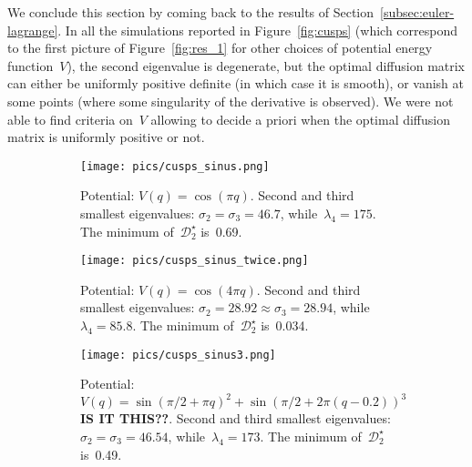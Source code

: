 \documentclass{article}
\newcommand{\Diff}{\mathcal{D}}
\begin{document}
We conclude this section by coming back to the results of Section~\ref{subsec:euler-lagrange}. In all the simulations reported in Figure~\ref{fig:cusps} (which correspond to the first picture of Figure~\ref{fig:res_1} for other choices of potential energy function~$V$), the second eigenvalue is degenerate, but the optimal diffusion matrix can either be uniformly positive definite (in which case it is smooth), or vanish at some points (where some singularity of the derivative is observed). We were not able to find criteria on~$V$ allowing to decide a priori when the optimal diffusion matrix is uniformly positive or not.


\begin{figure}
\centering
\begin{subfigure}[t]{0.49\linewidth}
\texttt{[image: pics/cusps\_sinus.png]}
\caption{Potential: $V(q) = \cos(\pi q)$. Second and third smallest eigenvalues: $\sigma_2 = \sigma_3 = 46.7$, while~$\lambda_4 = 175$. The minimum of~$\Diff^{\star}_2$ is~0.69.}
\label{fig:cusps-a}
\end{subfigure}
\hfill
\begin{subfigure}[t]{0.49\linewidth}
\texttt{[image: pics/cusps\_sinus\_twice.png]}
\caption{Potential: $V(q) = \cos(4\pi q)$. Second and third smallest eigenvalues: $\sigma_2 = 28.92 \approx \sigma_3 = 28.94$, while~$\lambda_4 = 85.8$. The minimum of~$\Diff^{\star}_2$ is~0.034.}
\label{fig:cusps-b}
\end{subfigure}
\begin{subfigure}[t]{0.49\linewidth}
\texttt{[image: pics/cusps\_sinus3.png]}
\caption{Potential: $V(q) = \sin(\pi/2 + \pi q)^2 + \sin(\pi/2 + 2\pi(q-0.2))^3${\bf IS IT THIS??}. Second and third smallest eigenvalues:  $\sigma_2= \sigma_3 = 46.54$, while~$\lambda_4 = 173$. The minimum of~$\Diff^{\star}_2$ is~0.49.}
\label{fig:cusps-c}
\end{subfigure}
\hfill
\begin{subfigure}[t]{0.49\linewidth}

\end{subfigure}
\end{figure}
\end{document}
